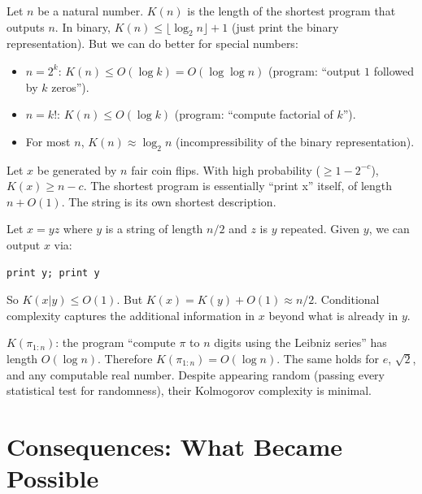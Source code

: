 \begin{example}
Let $n$ be a natural number. $K(n)$ is the length of the shortest program that outputs $n$. In binary, $K(n) \le \lfloor \log_2 n \rfloor + 1$ (just print the binary representation). But we can do better for special numbers:
\begin{itemize}
\item $n = 2^k$: $K(n) \le O(\log k) = O(\log \log n)$ (program: ``output $1$ followed by $k$ zeros'').
\item $n = k!$: $K(n) \le O(\log k)$ (program: ``compute factorial of $k$'').
\item For most $n$, $K(n) \approx \log_2 n$ (incompressibility of the binary representation).
\end{itemize}
\end{example}

\begin{example}
Let $x$ be generated by $n$ fair coin flips. With high probability ($\ge 1 - 2^{-c}$), $K(x) \ge n - c$. The shortest program is essentially ``print x'' itself, of length $n + O(1)$. The string is its own shortest description.
\end{example}

\begin{example}
Let $x = yz$ where $y$ is a string of length $n/2$ and $z$ is $y$ repeated. Given $y$, we can output $x$ via:
\begin{verbatim}
print y; print y
\end{verbatim}
So $K(x|y) \le O(1)$. But $K(x) = K(y) + O(1) \approx n/2$. Conditional complexity captures the additional information in $x$ beyond what is already in $y$.
\end{example}

\begin{example}
$K(\pi_{1:n})$: the program ``compute $\pi$ to $n$ digits using the Leibniz series'' has length $O(\log n)$. Therefore $K(\pi_{1:n}) = O(\log n)$. The same holds for $e$, $\sqrt{2}$, and any computable real number. Despite appearing random (passing every statistical test for randomness), their Kolmogorov complexity is minimal.
\end{example}

\section{Consequences: What Became Possible}
\label{sec:kolmogorov:consequences}

